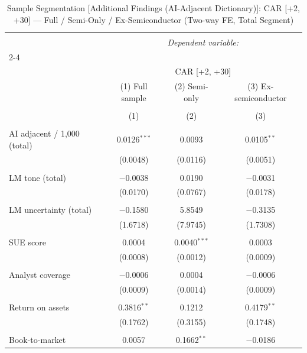 
\begin{table}[!htbp] \centering 
  \caption{Sample Segmentation [Additional Findings (AI-Adjacent Dictionary)]: CAR [+2, +30] — Full / Semi-Only / Ex-Semiconductor (Two-way FE, Total Segment)} 
  \label{} 
\begin{tabular}{@{\extracolsep{5pt}}lccc} 
\\[-1.8ex]\hline 
\hline \\[-1.8ex] 
 & \multicolumn{3}{c}{\textit{Dependent variable:}} \\ 
\cline{2-4} 
\\[-1.8ex] & \multicolumn{3}{c}{CAR [+2, +30]} \\ 
 & (1) Full sample & (2) Semi-only & (3) Ex-semiconductor \\ 
\\[-1.8ex] & (1) & (2) & (3)\\ 
\hline \\[-1.8ex] 
 AI adjacent / 1,000 (total) & 0.0126$^{***}$ & 0.0093 & 0.0105$^{**}$ \\ 
  & (0.0048) & (0.0116) & (0.0051) \\ 
  & & & \\ 
 LM tone (total) & $-$0.0038 & 0.0190 & $-$0.0031 \\ 
  & (0.0170) & (0.0767) & (0.0178) \\ 
  & & & \\ 
 LM uncertainty (total) & $-$0.1580 & 5.8549 & $-$0.3135 \\ 
  & (1.6718) & (7.9745) & (1.7308) \\ 
  & & & \\ 
 SUE score & 0.0004 & 0.0040$^{***}$ & 0.0003 \\ 
  & (0.0008) & (0.0012) & (0.0009) \\ 
  & & & \\ 
 Analyst coverage & $-$0.0006 & 0.0004 & $-$0.0006 \\ 
  & (0.0009) & (0.0014) & (0.0009) \\ 
  & & & \\ 
 Return on assets & 0.3816$^{**}$ & 0.1212 & 0.4179$^{**}$ \\ 
  & (0.1762) & (0.3155) & (0.1748) \\ 
  & & & \\ 
 Book-to-market & 0.0057 & 0.1662$^{**}$ & $-$0.0186 \\ 

\end{tabular}
\end{table}
